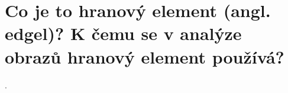 \section{Co je to hranový element (angl. edgel)? K čemu se v analýze obrazů hranový element používá?}.